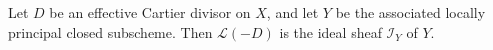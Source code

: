 Let $D$ be an effective Cartier divisor on $X$, and let $Y$ be the associated locally principal closed subscheme. Then $\mathcal{L}(-D)$ is the ideal sheaf $\mathcal{I}_Y$ of $Y$.
